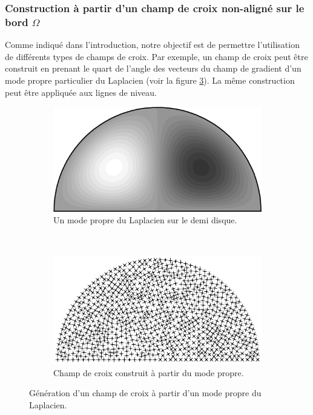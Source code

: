 \subsubsection*{Construction à partir d'un champ de croix non-aligné sur le bord $\Omega$}

Comme indiqué dans l'introduction, notre objectif est de permettre l'utilisation de différents types de champs de croix. Par exemple, un champ de croix peut être construit en prenant le quart de l'angle des vecteurs du champ de gradient d'un mode propre particulier du Laplacien (voir la figure \ref{fig:demiDisc_valProp}). La même construction peut être appliquée aux lignes de niveau.

\begin{figure}[!h]
\centering
\begin{subfigure}{0.65\textwidth}
    \includegraphics[width=\textwidth]{images/demiDiscValProp.eps}
    \caption{Un mode propre du Laplacien sur le demi disque.}
    \label{fig:demiDiscValPropSheet_first}
\end{subfigure}
\\[3ex]
\begin{subfigure}{0.75\textwidth}
    \includegraphics[width=\textwidth]{images/demiDiscValPropSheet.eps}
    \caption{Champ de croix construit à partir du mode propre.}
    \label{fig:demiDiscValPropSheet_second}
\end{subfigure}

\caption{Génération d'un champ de croix à partir d'un mode propre du Laplacien.}
\label{fig:demiDisc_valProp}
\end{figure}

